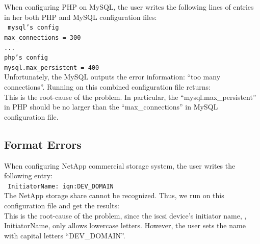 When configuring PHP on MySQL, the user writes the following lines 
of entries in her both PHP and MySQL configuration files:\\
\texttt{
 \hspace*{3em}mysql's config\\
 \hspace*{3em}max\_connections = 300\\
 \hspace*{3em}...\\
 \hspace*{3em}php's config\\
 \hspace*{3em}mysql.max\_persistent = 400\\}
Unfortunately, the MySQL outputs the error information:
``too many connections''.
Running \app on this combined configuration file returns:
\\
This is the root-cause of the problem.
In particular, the ``mysql.max\_persistent'' in PHP should be no
larger than the ``max\_connections'' in MySQL configuration file.

\subsection{Format Errors}

When configuring NetApp commercial storage system, 
the user writes the following entry:\\
\texttt{
 \hspace*{3em}InitiatorName: iqn:DEV\_DOMAIN\\
} 
The NetApp storage share cannot be recognized. 
Thus, we run \app on this configuration file and get the results:
\\
This is the root-cause of the problem,
since the iscsi device's initiator name, \ie, InitiatorName,
only allows lowercase letters. However, the user sets the name with
capital letters ``DEV\_DOMAIN''.


